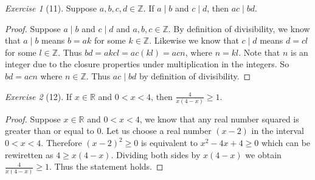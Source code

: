 \documentclass[12pt]{amsart}
\theoremstyle{remark}
\newtheorem*{exercise}{Exercise}%
\def\RR{\ensuremath{\mathbb R}}
\def\ZZ{\ensuremath{\mathbb Z}}
\theoremstyle{mycomment}
\begin{document}
\begin{exercise}[11] Suppose $a,b,c,d\in\ZZ$. If $a\mid b$ and $c\mid d$, then $ac\mid bd$.
\begin{proof}
Suppose $ a \mid b $ and $c \mid d$ and $a,b,c \in \ZZ$. By definition of divisibility, we know that $a \mid b$ means $b = ak$ for some $k \in \ZZ$. Likewise we know that $c \mid d$ means  $d = cl$ for some $l \in \ZZ$. Thus $bd = akcl = ac(kl) = acn$, where $n = kl$. Note that $n$ is an integer due to the closure properties under multiplication in the integers. So $bd = acn$ where $n \in \ZZ$. Thus $ac \mid bd$ by definition of divisibility.
\end{proof}
\end{exercise}
\begin{exercise}[12] If $x\in \RR$ and $0<x<4$, then $\frac{4}{x(4-x)}\ge 1$.
\begin{proof}
Suppose $x \in \RR$ and $0 < x < 4$, we know that any real number squared is greater than or equal to $0$. Let us choose a real number $(x-2)$ in the interval $0 < x < 4$. Therefore $(x-2)^2 \geq 0$ is equivalent to $x^2 - 4x + 4 \geq 0$ which can be rewiretten as $ 4 \geq x(4-x)$. Dividing both sides by $x(4-x)$ we obtain $\frac{4}{x(4-x)} \geq 1$. Thus the statement holds.
\end{proof}
\end{exercise}

 
\end{document}
